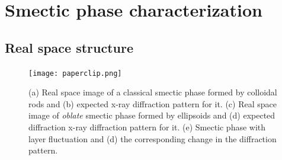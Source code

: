 \documentclass[aip,graphicx]{revtex4-1}
\begin{document}
\section{Smectic phase characterization}

\subsection{Real space structure}

\begin{figure}[]
\centering
\texttt{[image: paperclip.png]}
\caption{(a) Real space image of a classical smectic phase formed by colloidal rods and (b) expected x-ray diffraction pattern for it. (c) Real space image of \textit{oblate} smectic phase formed by ellipsoids and (d) expected diffraction x-ray diffraction pattern for it. (e) Smectic phase with layer fluctuation and (d) the corresponding change in the diffraction pattern.}
\label{paperclip}
\end{figure}

\end{document}
